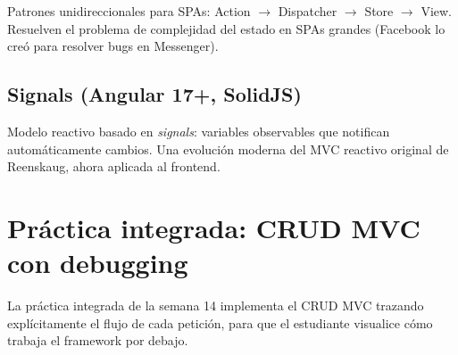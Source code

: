 \documentclass[11pt,a4paper,openany]{book}
\begin{document}
Patrones unidireccionales para SPAs: Action $\to$ Dispatcher $\to$
Store $\to$ View. Resuelven el problema de complejidad del estado en
SPAs grandes (Facebook lo creó para resolver bugs en Messenger).

\subsection{Signals (Angular 17+, SolidJS)}

Modelo reactivo basado en \emph{signals}: variables observables que
notifican automáticamente cambios. Una evolución moderna del MVC
reactivo original de Reenskaug, ahora aplicada al frontend.

\section{Práctica integrada: CRUD MVC con debugging}

La práctica integrada de la semana 14 implementa el CRUD MVC
trazando explícitamente el flujo de cada petición, para que el
estudiante visualice cómo trabaja el framework por debajo.
\end{document}
